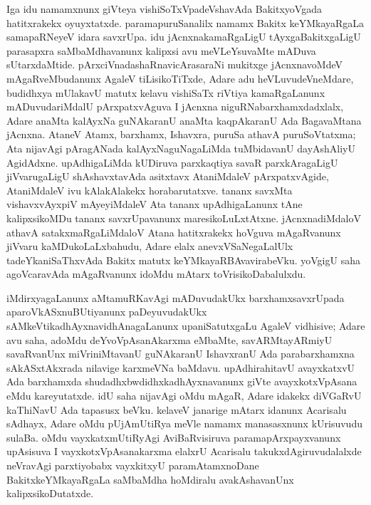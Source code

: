 Iga idu namamxnunx giVteya vishiSoTxVpadeVshavAda BakitxyoVgada hatitxrakekx oyuyxtatxde. paramapuruSanalilx namamx Bakitx keYMkayaRgaLa samapaRNeyeV idara savxrUpa. idu jAcnxnakamaRgaLigU tAyxgaBakitxgaLigU parasapxra saMbaMdhavanunx kalipxsi avu meVLeYsuvaMte mADuva sUtarxdaMtide. pArxciVnadashaRnavicArasaraNi mukitxge jAcnxnavoMdeV mAgaRveMbudanunx AgaleV tiLisikoTiTxde, Adare adu heVLuvudeVneMdare, budidhxya mUlakavU matutx kelavu vishiSaTx riVtiya kamaRgaLanunx mADuvudariMdalU pArxpatxvAguva I jAcnxna niguRNabarxhamxdadxlalx, Adare anaMta kalAyxNa guNAkaranU anaMta kaqpAkaranU Ada BagavaMtana jAcnxna. AtaneV Atamx, barxhamx, Ishavxra, puruSa athavA puruSoVtatxma; Ata nijavAgi pAragANada kalAyxNaguNagaLiMda tuMbidavanU dayAshAliyU AgidAdxne. upAdhigaLiMda kUDiruva parxkaqtiya savaR parxkAragaLigU jiVvarugaLigU shAshavxtavAda asitxtavx AtaniMdaleV pArxpatxvAgide, AtaniMdaleV ivu kAlakAlakekx horabarutatxve. tananx savxMta vishavxvAyxpiV mAyeyiMdaleV Ata tananx upAdhigaLanunx tAne kalipxsikoMDu tananx savxrUpavanunx maresikoLuLxtAtxne. jAcnxnadiMdaloV athavA satakxmaRgaLiMdaloV Atana hatitxrakekx hoVguva mAgaRvanunx jiVvaru kaMDukoLaLxbahudu, Adare elalx anevxVSaNegaLalUlx tadeYkaniSaThxvAda Bakitx matutx keYMkayaRBAvavirabeVku. yoVgigU saha agoVcaravAda mAgaRvanunx idoMdu mAtarx toVrisikoDabalulxdu.

iMdirxyagaLanunx aMtamuRKavAgi mADuvudakUkx barxhamxsavxrUpada aparoVkASxnu\-BUtiyanunx paDeyuvudakUkx sAMkeVtikadhAyxnavidhAnagaLanunx upaniSatutxgaLu AgaleV vidhisive; Adare avu saha, adoMdu deYvoVpAsanAkarxma eMbaMte, savARMtayAR\-miyU savaRvanUnx miVriniMtavanU guNAkaranU IshavxranU Ada parabarxhamxna sAkASx\-tAkxrada nilavige karxmeVNa baMdavu. upAdhirahitavU avayxkatxvU Ada barxhamxda shudadhx\-bwdidhxka\-dhAyxnavanunx giVte avayxkotxVpAsana eMdu kareyutatxde. idU saha nijavAgi oMdu mAgaR, Adare idakekx diVGaRvU kaThiNavU Ada tapasusx beVku. kelaveV janarige mAtarx idanunx Acarisalu sAdhayx, Adare oMdu pUjAmUtiRya meVle namamx manasasxnunx kUrisuvudu sulaBa. oMdu vayxkatxmUtiRyAgi AviBaRvisiruva paramapArxpayx\-vanunx upAsisuva I vayxkotxVpAsanakarxma elalxrU Acarisalu takukxdAgiruvudalalxde neVra\-vAgi parxtiyobabx vayxkitxyU paramAtamxnoDane BakitxkeYMkayaRgaLa saMbaMdha hoMdiralu ava\-kAshavanUnx kalipxsikoDutatxde.

